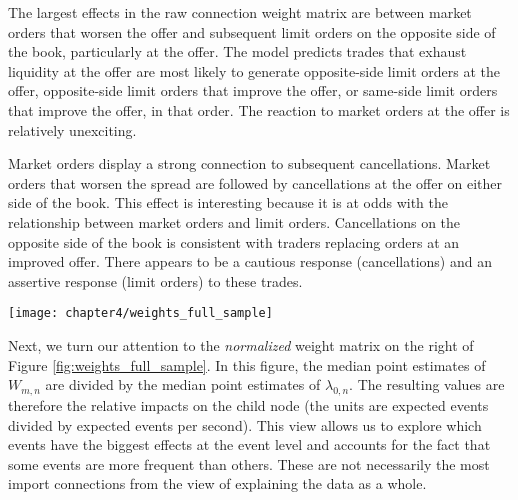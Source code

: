 		The largest effects in the raw connection weight matrix are between market orders that worsen the offer and subsequent limit orders on the opposite side of the book, particularly at the offer. The model predicts trades that exhaust liquidity at the offer are most likely to generate opposite-side limit orders at the offer, opposite-side limit orders that improve the offer, or same-side limit orders that improve the offer, in that order. The reaction to market orders at the offer is relatively unexciting.

		Market orders display a strong connection to subsequent cancellations. Market orders that worsen the spread are followed by cancellations at the offer on either side of the book. This effect is interesting because it is at odds with the relationship between market orders and limit orders. Cancellations on the opposite side of the book is consistent with traders replacing orders at an improved offer. There appears to be a cautious response (cancellations) and an assertive response (limit orders) to these trades.

		\begin{sidewaysfigure}[p]
			\small
			\linespread{1}
			\centering
			\texttt{[image: chapter4/weights\_full\_sample]}
			\captionsetup{skip=-20pt, position=below, font=footnotesize, justification=justified, width=\linewidth}
			\caption[Median of event connection point estimates: full sample]{Median of event connection point estimates: full sample. The figure shows the median connection strength between event types across the full sample of stocks. Larger values indicate stronger connections, which are expected to generate a greater number of child events. (Left) The median of connection weight estimates using the raw weight matrix estimates. This figure identifies the most important connections in an absolute sense. (Right) The median connection weight matrix after normalizing parent-child weights by the estimated background rate of child events. This figure identifies the most important connections in a relative sense.}
			\label{fig:weights_full_sample}
		\end{sidewaysfigure}

		Next, we turn our attention to the \textit{normalized} weight matrix on the right of Figure \ref{fig:weights_full_sample}. In this figure, the median point estimates of $W_{m,n}$ are divided by the median point estimates of $\lambda_{0,n}$. The resulting values are therefore the relative impacts on the child node (the units are expected events divided by expected events per second). This view allows us to explore which events have the biggest effects at the event level and accounts for the fact that some events are more frequent than others. These are not necessarily the most import connections from the view of explaining the data as a whole.

